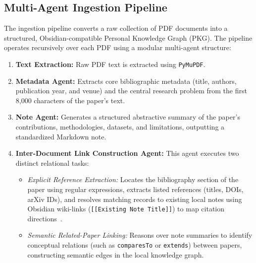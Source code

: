 \documentclass[runningheads]{llncs}
\begin{document}
\subsection{Multi-Agent Ingestion Pipeline}
The ingestion pipeline converts a raw collection of PDF documents into a structured, Obsidian-compatible Personal Knowledge Graph (PKG). The pipeline operates recursively over each PDF using a modular multi-agent structure:
\begin{enumerate}
    \item \textbf{Text Extraction:} Raw PDF text is extracted using \texttt{PyMuPDF}.
    \item \textbf{Metadata Agent:} Extracts core bibliographic metadata (title, authors, publication year, and venue) and the central research problem from the first 8,000 characters of the paper's text.
    \item \textbf{Note Agent:} Generates a structured abstractive summary of the paper's contributions, methodologies, datasets, and limitations, outputting a standardized Markdown note.
    \item \textbf{Inter-Document Link Construction Agent:} This agent executes two distinct relational tasks:
    \begin{itemize}
        \item \textit{Explicit Reference Extraction:} Locates the bibliography section of the paper using regular expressions, extracts listed references (titles, DOIs, arXiv IDs), and resolves matching records to existing local notes using Obsidian wiki-links (\texttt{[[Existing Note Title]]}) to map citation directions~\cite{tkaczyk2015cermine,councill2008parscit}.
        \item \textit{Semantic Related-Paper Linking:} Reasons over note summaries to identify conceptual relations (such as \texttt{comparesTo} or \texttt{extends}) between papers, constructing semantic edges in the local knowledge graph.
    \end{itemize}
\end{enumerate}
\end{document}
